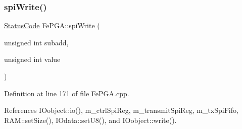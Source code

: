 \subsubsection{\texorpdfstring{spi\+Write()}{spiWrite()}\hspace{0.1cm}{\footnotesize\ttfamily [3/3]}}
{\footnotesize\ttfamily \hyperlink{classStatusCode}{Status\+Code} Fe\+P\+G\+A\+::spi\+Write (\begin{DoxyParamCaption}\item[{unsigned int}]{subadd,  }\item[{unsigned int}]{value }\end{DoxyParamCaption})}



Definition at line 171 of file Fe\+P\+G\+A.\+cpp.



References I\+Oobject\+::io(), m\+\_\+ctrl\+Spi\+Reg, m\+\_\+transmit\+Spi\+Reg, m\+\_\+tx\+Spi\+Fifo, R\+A\+M\+::set\+Size(), I\+Odata\+::set\+U8(), and I\+Oobject\+::write().


